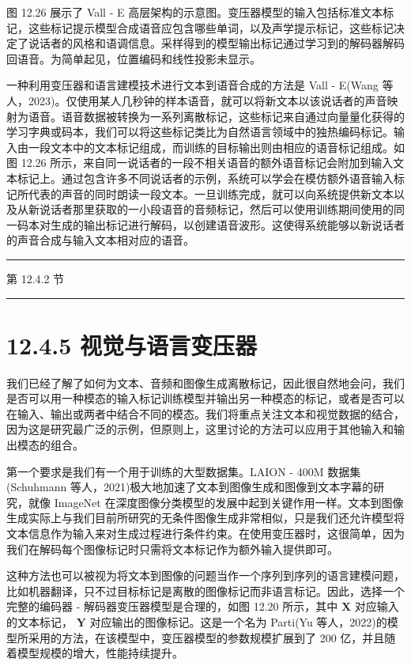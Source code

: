 \documentclass[10pt]{report}
\newcommand{\HRule}{\begin{center}\rule{0.9\linewidth}{0.2mm}\end{center}}
\begin{document}
图 12.26 展示了 Vall - E 高层架构的示意图。变压器模型的输入包括标准文本标记，这些标记提示模型合成语音应包含哪些单词，以及声学提示标记，这些标记决定了说话者的风格和语调信息。采样得到的模型输出标记通过学习到的解码器解码回语音。为简单起见，位置编码和线性投影未显示。

一种利用变压器和语言建模技术进行文本到语音合成的方法是 Vall - E(Wang 等人，2023)。仅使用某人几秒钟的样本语音，就可以将新文本以该说话者的声音映射为语音。语音数据被转换为一系列离散标记，这些标记来自通过向量量化获得的学习字典或码本，我们可以将这些标记类比为自然语言领域中的独热编码标记。输入由一段文本中的文本标记组成，而训练的目标输出则由相应的语音标记组成。如图 12.26 所示，来自同一说话者的一段不相关语音的额外语音标记会附加到输入文本标记上。通过包含许多不同说话者的示例，系统可以学会在模仿额外语音输入标记所代表的声音的同时朗读一段文本。一旦训练完成，就可以向系统提供新文本以及从新说话者那里获取的一小段语音的音频标记，然后可以使用训练期间使用的同一码本对生成的输出标记进行解码，以创建语音波形。这使得系统能够以新说话者的声音合成与输入文本相对应的语音。

\HRule

第 12.4.2 节

\HRule

\section*{12.4.5 视觉与语言变压器}

我们已经了解了如何为文本、音频和图像生成离散标记，因此很自然地会问，我们是否可以用一种模态的输入标记训练模型并输出另一种模态的标记，或者是否可以在输入、输出或两者中结合不同的模态。我们将重点关注文本和视觉数据的结合，因为这是研究最广泛的示例，但原则上，这里讨论的方法可以应用于其他输入和输出模态的组合。

第一个要求是我们有一个用于训练的大型数据集。LAION - 400M 数据集(Schuhmann 等人，2021)极大地加速了文本到图像生成和图像到文本字幕的研究，就像 ImageNet 在深度图像分类模型的发展中起到关键作用一样。文本到图像生成实际上与我们目前所研究的无条件图像生成非常相似，只是我们还允许模型将文本信息作为输入来对生成过程进行条件约束。在使用变压器时，这很简单，因为我们在解码每个图像标记时只需将文本标记作为额外输入提供即可。

这种方法也可以被视为将文本到图像的问题当作一个序列到序列的语言建模问题，比如机器翻译，只不过目标标记是离散的图像标记而非语言标记。因此，选择一个完整的编码器 - 解码器变压器模型是合理的，如图 12.20 所示，其中 \(\mathbf{X}\) 对应输入的文本标记， \(\mathbf{Y}\) 对应输出的图像标记。这是一个名为 Parti(Yu 等人，2022)的模型所采用的方法，在该模型中，变压器模型的参数规模扩展到了 200 亿，并且随着模型规模的增大，性能持续提升。
\end{document}
